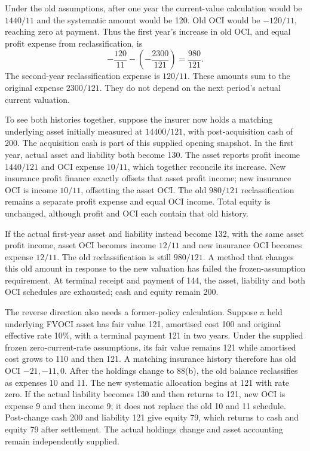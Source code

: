 Under the old assumptions, after one year the current-value calculation would
be \(1440/11\) and the systematic amount would be 120. Old OCI would be
\(-120/11\), reaching zero at payment. Thus the first year's increase in
old OCI, and equal profit expense from reclassification, is
\[
 -\frac{120}{11}-\left(-\frac{2300}{121}\right)
 =\frac{980}{121}.
\]
The second-year reclassification expense is \(120/11\). These amounts sum
to the original expense \(2300/121\). They do not depend on the next
period's actual current valuation.

To see both histories together, suppose the insurer now holds a matching
underlying asset initially measured at \(14400/121\), with post-acquisition
cash of 200. The acquisition cash is part of this supplied opening snapshot.
In the first year, actual asset and liability both become 130. The asset
reports profit income \(1440/121\) and OCI expense \(10/11\), which
together reconcile its increase. New insurance profit finance exactly offsets
that asset profit income; new insurance OCI is income \(10/11\), offsetting
the asset OCI. The old \(980/121\) reclassification remains a separate
profit expense and equal OCI income. Total equity is unchanged, although
profit and OCI each contain that old history.

If the actual first-year asset and liability instead become 132, with the same
asset profit income, asset OCI becomes income \(12/11\) and new insurance
OCI becomes expense \(12/11\). The old reclassification is still
\(980/121\). A method that changes this old amount in response to the new
valuation has failed the frozen-assumption requirement. At terminal receipt
and payment of 144, the asset, liability and both OCI schedules are exhausted;
cash and equity remain 200.

The reverse direction also needs a former-policy calculation. Suppose a held
underlying FVOCI asset has fair value 121, amortised cost 100 and original
effective rate 10\%, with a terminal payment 121 in two years. Under the
supplied frozen zero-current-rate assumptions, its fair value remains 121
while amortised cost grows to 110 and then 121. A matching insurance history
therefore has old OCI \(-21,-11,0\). After the holdings change to 88(b),
the old balance reclassifies as expenses 10 and 11. The new systematic
allocation begins at 121 with rate zero. If the actual liability becomes 130
and then returns to 121, new OCI is expense 9 and then income 9; it does not
replace the old 10 and 11 schedule. Post-change cash 200 and liability 121
give equity 79, which returns to cash and equity 79 after settlement. The
actual holdings change and asset accounting remain independently supplied.

